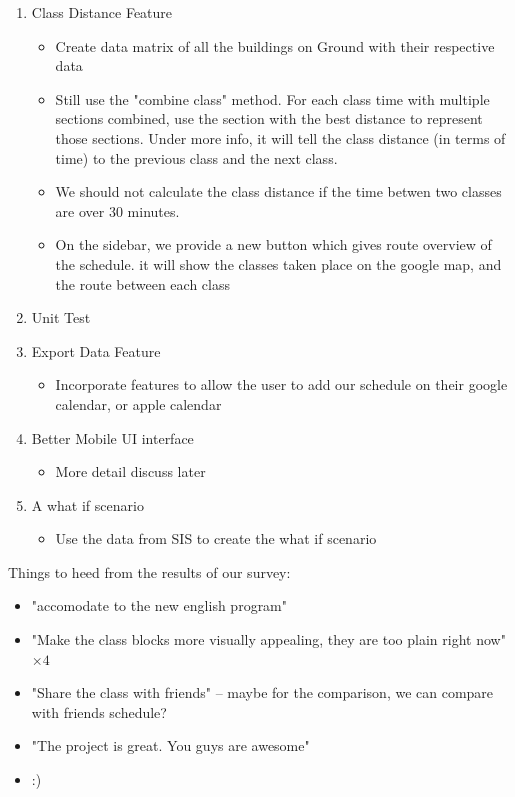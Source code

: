 \documentclass[dvips,12pt]{article}
\begin{document}
\begin{enumerate}
    \item Class Distance Feature
    \begin{itemize}
        \item Create data matrix of all the buildings on Ground with their respective data
        \item Still use the "combine class" method. For each class time with
        multiple sections combined, use the section with the best distance 
        to represent those sections. Under more info, it will tell the class distance
        (in terms of time) to the previous class and the next class. 
        \item We should not calculate the class distance if the time betwen two classes are over 30 minutes.
        \item On the sidebar, we provide a new button which gives route overview of the schedule. 
        it will show the classes taken place on the google map, and the route between each class
    \end{itemize}

    \item Unit Test

    \item Export Data Feature
    \begin{itemize}
        \item Incorporate features to allow the user to add our schedule on their
        google calendar, or apple calendar
    \end{itemize}

    \item Better Mobile UI interface
    \begin{itemize}
        \item More detail discuss later
    \end{itemize}

    \item A what if scenario
    \begin{itemize}
        \item Use the data from SIS to create the what if scenario
    \end{itemize}
    
\end{enumerate}

Things to heed from the results of our survey:
\begin{itemize}
    \item "accomodate to the new english program"
    \item "Make the class blocks more visually appealing, they are too plain right now" \(\times4\)
    \item "Share the class with friends" -- maybe for the comparison, we can compare with friends schedule?
    \item "The project is great. You guys are awesome"
    \item :)
\end{itemize}
\end{document}
